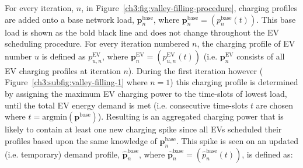 


For every iteration, $n$, in Figure~\ref{ch3:fig:valley-filling-procedure}, charging profiles are added onto a base network load, $\textbf{p}^\text{base}_{n}$, where $\textbf{p}^\text{base}_{n} = (p^\text{base}_{n}(t))$.
This base load is shown as the bold black line and does not change throughout the EV scheduling procedure.
For every iteration numbered $n$, the charging profile of EV number $u$ is defined as $p^\text{EV}_{u,n}$, where $\textbf{p}^\text{EV}_n = (p^\text{EV}_{u,n}(t))$ (i.e. $\textbf{p}^\text{EV}_n$ consists of all EV charging profiles at iteration $n$).
During the first iteration however ( Figure~\ref{ch3:subfig:valley-filling-1} where $n=1$) this charging profile is determined by assigning the maximum EV charging power to the time-slots of lowest load, until the total EV energy demand is met (i.e. consecutive time-slots $t$ are chosen where $t = \text{argmin}(\textbf{p}^\text{base})$).
Resulting is an aggregated charging power that is likely to contain at least one new charging spike since all EVs scheduled their profiles based upon the same knowledge of $\textbf{p}^\text{base}_{n}$.
This spike is seen on an updated (i.e. temporary) demand profile, $\hat{\textbf{p}}^\text{base}_{n}$, where $\hat{\textbf{p}}^\text{base}_{n} = (\hat{p}^\text{base}_{n}(t))$, is defined as:




